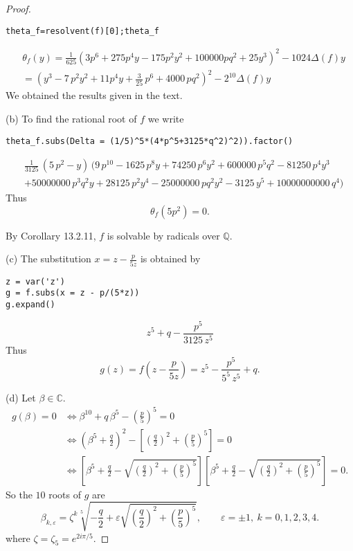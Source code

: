 \documentclass[11pt,a4paper]{article}
\newcommand{\Q}{\mathbb{Q}}
\newcommand{\C}{\mathbb{C}}
\begin{document}
\begin{proof}
\begin{verbatim}
theta_f=resolvent(f)[0];theta_f
\end{verbatim}
\begin{align*}
&\theta_f(y) = \frac{1}{625} \left(3 p^{6} +275 p^{4}y-175 p^{2}y^2+ 100000 p q^{2}+25y^3\right)^2 - 1024\Delta(f) y\\
& = \left(y^3-7 \, p^{2}y^2+11 p^{4}y+\frac{3}{25} \, p^{6} + 4000 \, p q^{2}\right)^2 - 2^{10}\Delta(f) y
\end{align*}
We obtained the results given in the text.

\item[(b)]
To find the rational root of $f$ we write
\begin{verbatim}
theta_f.subs(Delta = (1/5)^5*(4*p^5+3125*q^2)^2)).factor()
\end{verbatim} 
\begin{align*}
&\frac{1}{3125} \, (5 \, p^{2} - y)\, (9 \, p^{10} - 1625 \, p^{8} y + 74250 \, p^{6} y^{2} + 600000 \, p^{5} q^{2} - 81250 \, p^{4} y^{3}\\
& + 50000000 \, p^{3} q^{2} y + 28125 \, p^{2} y^{4} - 25000000 \, p q^{2} y^{2} - 3125 \, y^{5} + 10000000000 \, q^{4})
\end{align*}
Thus $$\theta_f(5p^2) = 0.$$

By Corollary 13.2.11, $f$ is solvable by radicals over $\Q$.

\item[(c)] The substitution $x = z - \frac{p}{5z}$ is obtained by
\begin{verbatim}
z = var('z')
g = f.subs(x = z - p/(5*z))
g.expand()
\end{verbatim}
$$z^{5} + q - \frac{p^{5}}{3125 \, z^{5}}$$
Thus
$$g(z) = f\left( z - \frac{p}{5z}\right) = z^5 - \frac{p^{5}}{5^5 \, z^{5}} +q.$$

\item[(d)] Let $\beta \in \C$.
\begin{align*}
g(\beta) = 0 &\iff \beta^{10} +q\,\beta^5 -\left(\frac{p}{5}\right)^5 = 0\\
&\iff\left(\beta^5 +\frac{q}{2} \right)^2 - \left[ \left(\frac{q}{2}\right)^2 + \left(\frac{p}{5}\right)^5\right] = 0\\
&\iff \left[ \beta^5 + \frac{q}{2} - \sqrt{ \left(\frac{q}{2}\right)^2 + \left(\frac{p}{5}\right)^5 } \right]\left[ \beta^5 + \frac{q}{2} - \sqrt{ \left(\frac{q}{2}\right)^2 + \left(\frac{p}{5}\right)^5 } \right] = 0.
\end{align*}
So the $10$ roots of $g$ are
$$\beta_{k,\varepsilon} = \zeta^k \sqrt[5]{- \frac{q}{2} + \varepsilon \sqrt{ \left(\frac{q}{2}\right)^2 + \left(\frac{p}{5}\right)^5 }},\qquad\varepsilon = \pm 1,\  k=0,1,2,3,4.$$
where $\zeta = \zeta_5 = e^{2i\pi/5}$.


\end{proof}
\end{document}
